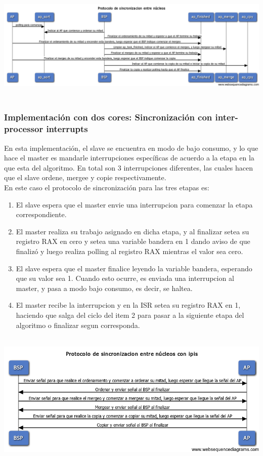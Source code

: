    	\begin{center}
        \includegraphics[height=5.5cm]{images/sync-sorting-seq.png}
    \end{center}

    \subsubsection{Implementación con dos cores: Sincronización con inter-processor interrupts}
    	En esta implementación, el slave se encuentra en modo de bajo consumo, y lo que hace el master es mandarle interrupciones específicas de acuerdo a la etapa en la que esta del algoritmo. En total son 3 interrupciones diferentes, las cuales hacen que el slave ordene, mergee y copie respectivamente.\\

    	En este caso el protocolo de sincronización para las tres etapas es:
    	\begin{enumerate}
    		\item El slave espera que el master envie una interrupcion para comenzar la etapa correspondiente.
    		\item El master realiza su trabajo asignado en dicha etapa, y al finalizar setea su registro RAX en cero y setea una variable bandera en 1 dando aviso de que finalizó y luego realiza polling al registro RAX mientras el valor sea cero.
    		\item El slave espera que el master finalice leyendo la variable bandera, esperando que su valor sea 1. Cuando esto ocurre, es enviada una interrupcion al master, y pasa a modo bajo consumo, es decir, se haltea.
    		\item El master recibe la interrupcion y en la ISR setea su registro RAX en 1, haciendo que salga del ciclo del item 2 para pasar a la siguiente etapa del algoritmo o finalizar segun corresponda.    		
    	\end{enumerate}


   	\begin{center}
        \includegraphics[height=6.5cm]{images/ipis-sorting-seq.png}
    \end{center}
